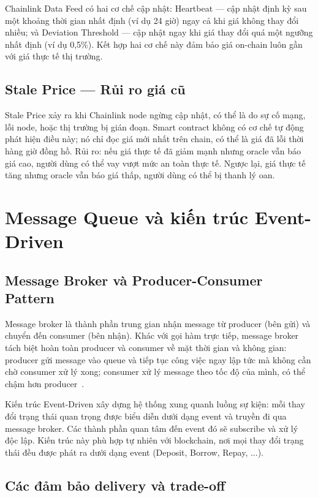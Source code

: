 \documentclass[../DoAn.tex]{subfiles}
\begin{document}
Chainlink Data Feed có hai cơ chế cập nhật: Heartbeat --- cập nhật định kỳ sau một khoảng thời gian nhất định (ví dụ 24 giờ) ngay cả khi giá không thay đổi nhiều; và Deviation Threshold --- cập nhật ngay khi giá thay đổi quá một ngưỡng nhất định (ví dụ 0,5\%). Kết hợp hai cơ chế này đảm bảo giá on-chain luôn gần với giá thực tế thị trường.

\subsection{Stale Price --- Rủi ro giá cũ}


Stale Price xảy ra khi Chainlink node ngừng cập nhật, có thể là do sự cố mạng, lỗi node, hoặc thị trường bị gián đoạn. Smart contract không có cơ chế tự động phát hiện điều này; nó chỉ đọc giá mới nhất trên chain, có thể là giá đã lỗi thời hàng giờ đồng hồ. Rủi ro: nếu giá thực tế đã giảm mạnh nhưng oracle vẫn báo giá cao, người dùng có thể vay vượt mức an toàn thực tế. Ngược lại, giá thực tế tăng nhưng oracle vẫn báo giá thấp, người dùng có thể bị thanh lý oan.

\section{Message Queue và kiến trúc Event-Driven}


\subsection{Message Broker và Producer-Consumer Pattern}


Message broker là thành phần trung gian nhận message từ producer (bên gửi) và chuyển đến consumer (bên nhận). Khác với gọi hàm trực tiếp, message broker tách biệt hoàn toàn producer và consumer về mặt thời gian và không gian: producer gửi message vào queue và tiếp tục công việc ngay lập tức mà không cần chờ consumer xử lý xong; consumer xử lý message theo tốc độ của mình, có thể chậm hơn producer~\cite{RabbitMQDocs}.

Kiến trúc Event-Driven xây dựng hệ thống xung quanh luồng sự kiện: mỗi thay đổi trạng thái quan trọng được biểu diễn dưới dạng event và truyền đi qua message broker. Các thành phần quan tâm đến event đó sẽ subscribe và xử lý độc lập. Kiến trúc này phù hợp tự nhiên với blockchain, nơi mọi thay đổi trạng thái đều được phát ra dưới dạng event (Deposit, Borrow, Repay, ...).

\subsection{Các đảm bảo delivery và trade-off}
\end{document}
